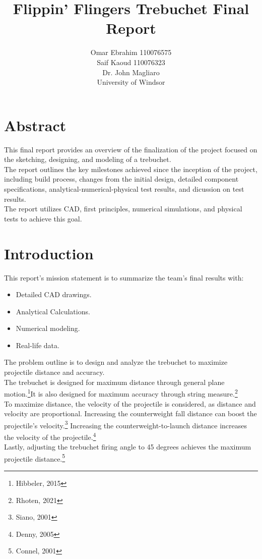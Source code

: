 \documentclass[12pt, titlepage]{article}
\title{Flippin' Flingers Trebuchet Final Report}
\author{Omar Ebrahim 110076575\\Saif Kaoud 110076323\\[10pt] Dr. John Magliaro\\
University of Windsor}
\begin{document}
    \maketitle
    \section{Abstract}
    This final report provides an overview of the finalization of the project focused on the sketching, designing, and modeling of a trebuchet.\\[10pt]
    The report outlines the key milestones achieved since the inception of the project, 
    including build process, changes from the initial design, detailed component specifications, analytical-numerical-physical test results, and dicussion on test results.\\[10pt]
    The report utilizes CAD, first principles, numerical simulations, and physical tests to achieve this goal.
    \newpage
    \tableofcontents
    \listoffigures
    \newpage
    \section{Introduction}
    This report's mission statement is to summarize the team's final results with:
    \begin{itemize}
        \item Detailed CAD drawings.
        \item Analytical Calculations.
        \item Numerical modeling.
        \item Real-life data.
    \end{itemize}
    The problem outline is to design and analyze the trebuchet to maximize
    projectile distance and accuracy.\\[10pt]
    The trebuchet is designed for maximum distance through general
    plane motion.\footnote{Hibbeler, 2015}It is also designed for maximum 
    accuracy through string measure.\footnote{Rhoten, 2021}\\[10pt]
    To maximize distance, the velocity of the projectile is considered, as
    distance and velocity are proportional. Increasing the counterweight 
    fall distance can boost the projectile's velocity.\footnote{Siano, 2001}
    Increasing the counterweight-to-launch distance increases the velocity 
    of the projectile.\footnote{Denny, 2005}\\[10pt]
    Lastly, adjusting the trebuchet firing angle to 
    45 degrees achieves the maximum projectile distance.\footnote{Connel, 2001}
    \newpage
\end{document}

